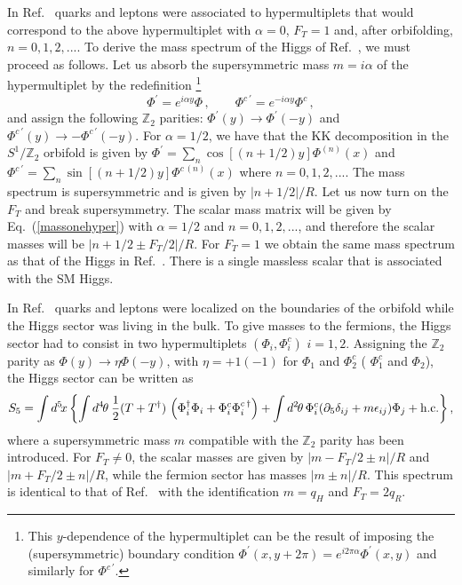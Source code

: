 \documentclass[a4paper,12pt]{article}
\newcommand{\Ft}{F_{T}}
\newcommand{\Zparity}{\ensuremath{\mathbb{Z}_2}}
\begin{document}
In Ref.~\cite{bhn} 
quarks and leptons were associated to  hypermultiplets
that would correspond to the above hypermultiplet
with $\alpha=0$, $F_T=1$ and, after orbifolding,
$n=0,1,2,...$.
To derive the mass spectrum of the Higgs of Ref.~\cite{bhn},
 we must proceed 
as follows.
Let us 
absorb the supersymmetric mass $m=i\alpha$  of the hypermultiplet
by the redefinition
\footnote{This $y$-dependence of the hypermultiplet 
can be the result of imposing the 
(supersymmetric) boundary condition 
$\Phi^{'}(x,y+2\pi) = e^{i 2\pi\alpha }\Phi^{'}(x,y)$
and similarly for
$\Phi^{c\, '}$.} 
\begin{equation}
\Phi^{'} = e^{i \alpha y}\Phi
\, ,\qquad 
\Phi^{c\, '} 
= e^{-i \alpha y}\Phi^c\, ,
\end{equation}
and assign  the following $\Zparity$
parities:
$\Phi^{'}(y)\rightarrow\Phi^{'}(-y)$
and $\Phi^{c\, '}(y)\rightarrow-\Phi^{c\, '}(-y)$.
For $\alpha=1/2$, we have
 that the KK decomposition 
in  the $S^1/\Zparity$ orbifold 
is given by
$\Phi^{'} = \sum_n \cos[(n+1/2) y]\Phi^{(n)}(x)$
and $\Phi^{c\, '}= \sum_n \sin[(n+1/2) y]\Phi^{c\, (n)}(x)$ 
where $n=0,1,2,...$.
The mass spectrum  is supersymmetric and is given by $|n+1/2|/R$. 
Let us now turn on the $F_T$ and break supersymmetry. 
The scalar mass matrix will be given by 
Eq.~(\ref{massonehyper}) with $\alpha=1/2$ and $n=0,1,2,...$,
and therefore the scalar
masses will be $|n+1/2\pm F_T/2|/R$. 
For $F_T=1$ we obtain the same mass spectrum as that of the
Higgs in Ref.~\cite{bhn}.
There is a single massless scalar that is associated 
with the SM Higgs.



In Ref.~\cite{pq} 
quarks and leptons were localized on the boundaries
of the orbifold
while the Higgs sector was living in the bulk.
To give  masses to the fermions, 
the Higgs sector had to consist in two
hypermultiplets
$(\Phi_i, \Phi^{c}_i)$ $i=1,2$.
Assigning the $\Zparity$ parity as
$\Phi(y) \rightarrow \eta \Phi(-y)$, with
$\eta=+1 (-1)$ for $\Phi_{1}$ and $\Phi_{2}^{c}$ (
$\Phi^{c}_{1}$ and $\Phi_{2}$), 
the Higgs sector
 can be written as
\begin{equation}
        S_5  = \int d^{5}\! x\,
         \biggl\{ \int
                d^4\mspace{-2mu}\theta\: \frac{1}{2} (T + T^{\dag} ) \,
                \left( \Phi^{\dag}_i \Phi_i + \Phi^{c}_i \Phi^{c\, \dag}_i
                \right) + \int d^2\mspace{-2mu} \theta\, \Phi^{c}_i
                (\partial_5\delta_{ij}+m\epsilon_{ij}) \Phi_j +\text{h.c.}
            \biggr\}\, ,
\end{equation}
where a supersymmetric mass $m$ compatible with the $\Zparity$ parity
has been introduced.
For $F_T\not=0$, the scalar masses are   
given by $|m-\Ft/2\pm n|/R$ and $|m+\Ft/2\pm n|/R$, 
while the fermion sector
has masses
$|m\pm n|/R$.         
This spectrum is  identical to that of Ref.~\cite{pq}
with the identification $m=q_H$ and $F_T=2q_R$.
\end{document}
